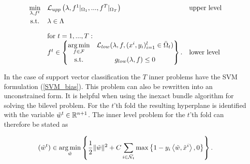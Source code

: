 
\begin{equation}
	\begin{array}{cll}
	\displaystyle\min_{\lambda, f^t} & \mathcal{L}_{upp}\left(\lambda,f^1|_{\Omega_1},...,f^T|_{\Omega_T}\right) & \text{upper level} \vspace{0.5ex}\\
	\text{s.t.} & \lambda \in \Lambda & \vspace{1em}\\
	& \text{for } t = 1,...,T: & \\
	& f^t \in \begin{Bmatrix} \displaystyle\argmin_{f\in \mathcal{F}} & \mathcal{L}_{low}(\lambda,f,(x^i,y_i)_{i = 1}^l\in \bar{\Omega}_t) \vspace{0.5ex}\\
	                        \text{s.t.} & g_{low}(\lambda,f) \leq 0 
													\end{Bmatrix}. & \text{lower level}
	\end{array}
\end{equation}

In the case of support vector classification the \(T\) inner problems have the SVM formulation %
(\ref{SVM_bias}). %
This problem can also be rewritten into an unconstrained form. It is helpful when using the inexact bundle algorithm for solving the bilevel problem.
For the \(t\)'th fold the resulting hyperplane is identified with the variable \(\tilde{w}^t \in \mathbb{R}^{n+1}\).
The inner level problem for the \(t\)'th fold can therefore be stated as



\begin{equation}
	(\tilde{w}^t) \in \operatorname*{arg\,min}_{\tilde{w}} \left\{\frac{1}{2} \|\tilde{w}\|^2+C\sum_{i\in \bar{\mathcal{N}}_t}{\max\left\{1-y_i\left\langle \tilde{w},\tilde{x}^i\right\rangle,0\right\}}\right\}.
\label{lower_t}
\end{equation}


